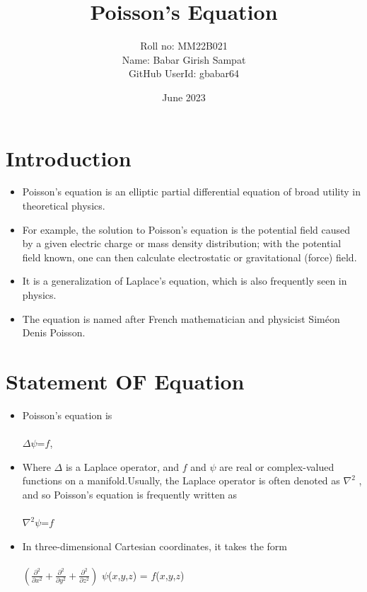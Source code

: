 \documentclass{article}
\title{Poisson's Equation}
\author{Roll no: MM22B021 \\ Name: Babar Girish Sampat \\ GitHub UserId: gbabar64}
\date{June 2023}
\begin{document}
\maketitle

\section{Introduction}

\begin{itemize}
    \item Poisson's equation is an elliptic partial differential equation of broad utility in theoretical physics.
    \item For example, the solution to Poisson's equation is the potential field caused by a given electric charge or mass density distribution; with the potential field known, one can then calculate electrostatic or gravitational (force) field.
    \item  It is a generalization of Laplace's equation, which is also frequently seen in physics.
    \item The equation is named after French mathematician and physicist Siméon Denis Poisson.
\end{itemize}

\section{Statement OF Equation}

\begin{itemize}
    \item Poisson's equation is \\\\
\indent\hspace{1cm} $\Delta$$\psi$=$f$, \\
    \item Where $\Delta$ is a Laplace operator, and $f$ and $\psi$ are real or complex-valued functions on a manifold.Usually, the Laplace operator is often denoted as 
$\nabla^2$ , and so Poisson's equation is frequently written as \\\\
\indent\hspace{1cm} $\nabla^2$$\psi$=$f$ \\
    \item In three-dimensional Cartesian coordinates, it takes the form \\\\
\indent\hspace{1cm}$(\frac{\partial^2}{\partial x^2}+\frac{\partial^2}{\partial y^2}+\frac{\partial^2}{\partial z^2})$ $\psi$($x$,$y$,$z$) = $f$($x$,$y$,$z$)
\end{itemize}
\end{document}
